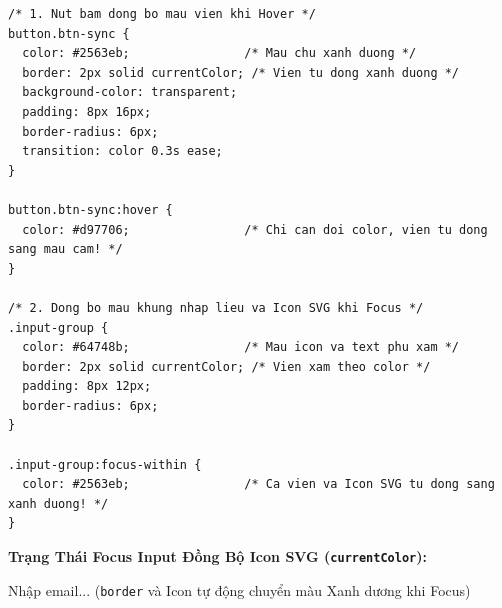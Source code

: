 \documentclass[11pt,oneside]{book}
\newcommand{\codeinline}[1]{\textcolor{accentOrange}{\texttt{#1}}}
\begin{document}
\begin{codeWindow}
\begin{lstlisting}[language=CSS3]
/* 1. Nut bam dong bo mau vien khi Hover */
button.btn-sync {
  color: #2563eb;                /* Mau chu xanh duong */
  border: 2px solid currentColor; /* Vien tu dong xanh duong */
  background-color: transparent;
  padding: 8px 16px;
  border-radius: 6px;
  transition: color 0.3s ease;
}

button.btn-sync:hover {
  color: #d97706;                /* Chi can doi color, vien tu dong sang mau cam! */
}

/* 2. Dong bo mau khung nhap lieu va Icon SVG khi Focus */
.input-group {
  color: #64748b;                /* Mau icon va text phu xam */
  border: 2px solid currentColor; /* Vien xam theo color */
  padding: 8px 12px;
  border-radius: 6px;
}

.input-group:focus-within {
  color: #2563eb;                /* Ca vien va Icon SVG tu dong sang xanh duong! */
}
\end{lstlisting}
\end{codeWindow}

\begin{browserWindow}
\vspace{2pt}
\begin{tcolorbox}[
    enhanced,
    colback=white,
    colframe=gray!30,
    arc=6pt, boxrule=0.8pt,
    top=10pt, bottom=10pt, left=12pt, right=12pt
]
  {\sffamily\bfseries\color{primaryBlue} Trạng Thái Focus Input Đồng Bộ Icon SVG (\codeinline{currentColor}):}\\[4pt]
  \begin{tcolorbox} \quad Nhập email... \quad (\codeinline{border} và Icon tự động chuyển màu Xanh dương khi Focus)
  \end{tcolorbox}
\end{tcolorbox}
\end{browserWindow}
\end{document}
